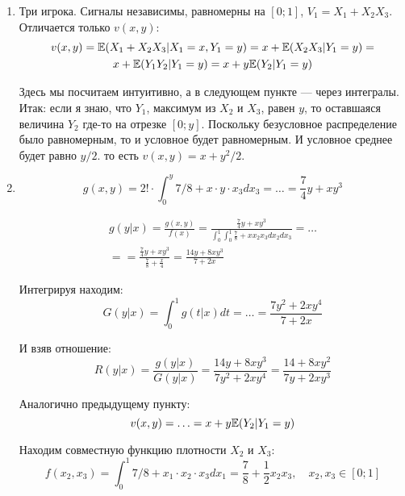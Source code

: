 \begin{enumerate}
\begin{enumerate}
\item Три игрока. Сигналы независимы, равномерны на $ [0;1] $, $ V_{1}=X_{1}+X_{2}X_{3} $.
Отличается только $ v(x,y) $:
\begin{multline}
v(x,y)=\mathbb{E}(X_{1}+X_{2}X_{3}|X_{1}=x,Y_{1}=y)=x+\mathbb{E}(X_{2}X_{3}|Y_{1}=y)=\\
x+\mathbb{E}(Y_{1}Y_{2}|Y_{1}=y)=x+y\mathbb{E}(Y_{2}|Y_{1}=y)
\end{multline}

Здесь мы посчитаем интуитивно, а в следующем пункте — через интегралы. Итак: если я знаю, что $ Y_{1} $, максимум из $ X_{2} $ и $ X_{3} $, равен $ y $, то оставшаяся величина $ Y_{2} $ где-то на отрезке $[0;y] $. Поскольку безусловное распределение было равномерным, то и условное будет равномерным. И условное среднее будет равно $ y/2 $. то есть $ v(x,y)=x+y^{2}/2 $.


\item

\begin{equation}
g(x,y)=2!\cdot \int_{0}^{y} 7/8+x\cdot y\cdot x_{3} dx_{3}=\ldots=\frac{7}{4}y+xy^{3}
\end{equation}

\begin{multline}
g(y|x)=\frac{g(x,y)}{f(x)}=\frac{\frac{7}{4}y+xy^{3}}{\int_{0}^{1}\int_{0}^{1} \frac{7}{8}+xx_{2}x_{3}dx_{2}dx_{3}}=\ldots\\
==\frac{\frac{7}{4}y+xy^{3}}{\frac{7}{8}+\frac{x}{4}}=\frac{14y+8xy^{3}}{7+2x}
\end{multline}

Интегрируя находим:
\begin{equation}
G(y|x)=\int_{0}^{1} g(t|x) dt=\ldots=\frac{7y^{2}+2xy^{4}}{7+2x}
\end{equation}

И взяв отношение:
\begin{equation}
R(y|x)=\frac{g(y|x)}{G(y|x)}=\frac{14y+8xy^{3}}{7y^{2}+2xy^{4}}=\frac{14+8xy^{2}}{7y+2xy^{3}}
\end{equation}

Аналогично предыдущему пункту:
\begin{equation}
v(x,y)=\ldots=x+y\mathbb{E}(Y_{2}|Y_{1}=y)
\end{equation}



Находим совместную функцию плотности $ X_{2} $ и $ X_{3} $:
\begin{equation}
f(x_{2},x_{3})=\int_{0}^{1} 7/8+x_{1}\cdot x_{2}\cdot x_{3} dx_{1}=\frac{7}{8}+\frac{1}{2}x_{2}x_{3}, \quad x_{2},x_{3}\in [0;1]
\end{equation}


\end{enumerate}
\end{enumerate}
